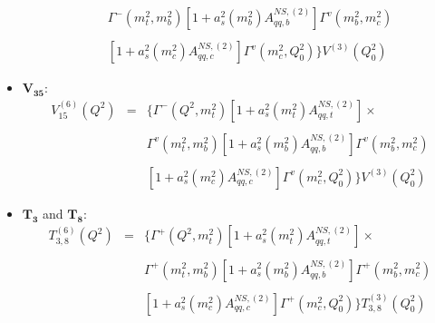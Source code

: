 \documentclass[10pt,a4paper]{article}
\begin{document}
\begin{itemize}
\begin{equation}
\begin{array}{rcl}
\\
& & \displaystyle \Gamma^{-}(m_t^2,m_b^2)[1+a_s^2(m_b^2)A_{qq,b}^{N\!S,(2)}]\Gamma^{v}(m_b^2,m_c^2)\\ 
\\
& & \displaystyle [1+a_s^2(m_c^2)A_{qq,c}^{N\!S,(2)}]\Gamma^{v}(m_c^2,Q_0^2)\Big\}V^{(3)}(Q^2_0)
\end{array}
\end{equation}
\item $\mathbf{V_{35}}$:
\begin{equation}
\begin{array}{rcl}
V^{(6)}_{15}(Q^2)&=&\displaystyle \Big\{\Gamma^{-}(Q^2,m_t^2)[1+a_s^2(m_t^2)A_{qq,t}^{N\!S,(2)}]\times\\
\\
& & \displaystyle \Gamma^{v}(m_t^2,m_b^2)[1+a_s^2(m_b^2)A_{qq,b}^{N\!S,(2)}]\Gamma^{v}(m_b^2,m_c^2)\\ 
\\
& & \displaystyle [1+a_s^2(m_c^2)A_{qq,c}^{N\!S,(2)}]\Gamma^{v}(m_c^2,Q_0^2)\Big\}V^{(3)}(Q^2_0)
\end{array}
\end{equation}
\item $\mathbf{T_3}$ and $\mathbf{T_8}$:
\begin{equation}
\begin{array}{rcl}
T^{(6)}_{3,8}(Q^2)&=&\displaystyle \Big\{\Gamma^{+}(Q^2,m_t^2)[1+a_s^2(m_t^2)A_{qq,t}^{N\!S,(2)}]\times\\
\\
& & \displaystyle \Gamma^{+}(m_t^2,m_b^2)[1+a_s^2(m_b^2)A_{qq,b}^{N\!S,(2)}]\Gamma^{+}(m_b^2,m_c^2)\\
\\
& & \displaystyle [1+a_s^2(m_c^2)A_{qq,c}^{N\!S,(2)}]\Gamma^{+}(m_c^2,Q_0^2)\Big\}T^{(3)}_{3,8}(Q^2_0)
\end{array}
\end{equation}


\end{itemize}
\end{document}

